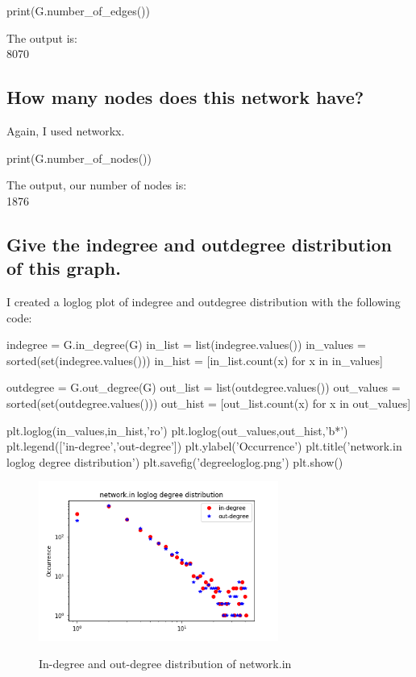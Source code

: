 \documentclass[12pt]{amsart}
\begin{document}
\begin{python}
print(G.number_of_edges())
\end{python}

The output is: \\
8070 \\

\subsection{How many nodes does this network have?}

Again, I used networkx.

\begin{python}
print(G.number_of_nodes())
\end{python}

The output, our number of nodes is: \\
1876 \\


\subsection{Give the indegree and outdegree distribution of this graph.}

I created a loglog plot of indegree and outdegree distribution with the following code:

\begin{python}
indegree = G.in_degree(G)
in_list = list(indegree.values())
in_values = sorted(set(indegree.values()))
in_hist = [in_list.count(x) for x in in_values]

outdegree = G.out_degree(G)
out_list = list(outdegree.values())
out_values = sorted(set(outdegree.values()))
out_hist = [out_list.count(x) for x in out_values]

plt.loglog(in_values,in_hist,'ro')
plt.loglog(out_values,out_hist,'b*')
plt.legend(['in-degree','out-degree'])
plt.ylabel('Occurrence')
plt.title('network.in loglog degree distribution')
plt.savefig('degreeloglog.png')
plt.show()
\end{python}

\begin{figure}[h]
\caption{In-degree and out-degree distribution of network.in}
\centering
\includegraphics[width=0.7\textwidth]{degreeloglog.png}
\label{degreeloglog}
\end{figure}
\end{document}
